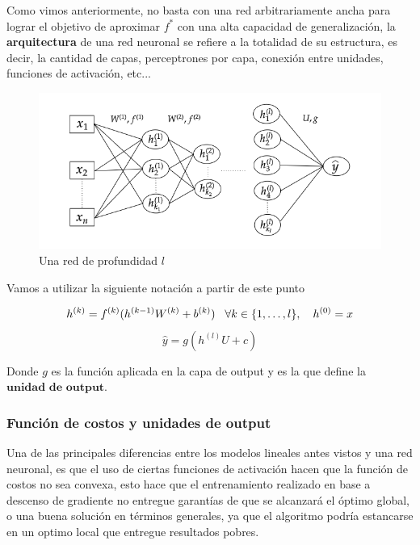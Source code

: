 Como vimos anteriormente, no basta con una red arbitrariamente ancha para lograr el objetivo de aproximar $f^{*}$ con una alta capacidad de generalización, la \textbf{arquitectura} de una red neuronal se refiere a la totalidad de su estructura, es decir, la cantidad de capas, perceptrones por capa, conexión entre unidades, funciones de activación, etc... 

\begin{figure}[H]
	\centering
	\includegraphics[scale=.5]{img/cap7_red}
	\caption{Una red de profundidad $l$}
\end{figure}

Vamos a utilizar la siguiente notación a partir de este punto 

\begin{equation}
	h^{(k)} = f^{(k)}(h^{(k-1)}W^{(k)} + b^{(k)}) \hspace{0.3cm} \forall k \in \{1 ,\dots, l\}, \quad h^{(0)}=x
	\end{equation}
	\begin{equation}
	\hat{y} = g(h^{(l)}U + c)
\end{equation}
	
Donde $g$ es la función aplicada en la capa de output y es la que define la $\textbf{unidad de output}.$

\subsubsection{Función de costos y unidades de output}

Una de las principales diferencias entre los modelos lineales antes vistos y una red neuronal, es que el uso de ciertas funciones de activaci\'on hacen que la funci\'on de costos no sea convexa, esto hace que el entrenamiento realizado en base a descenso de gradiente no entregue garant\'ias de que se alcanzar\'a el \'optimo global, o una buena solución en términos generales, ya que el algoritmo podría estancarse en un optimo local que entregue resultados pobres. 

